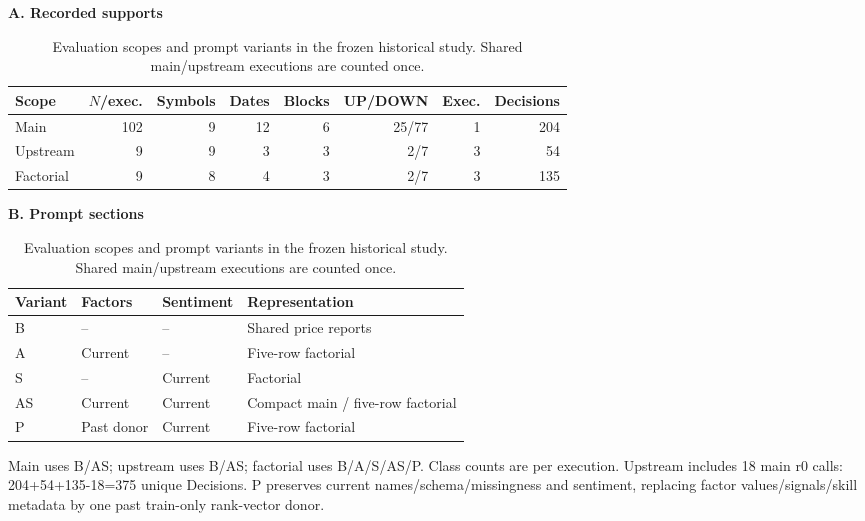 \begin{table}[!htbp]
\centering\small
\setlength{\tabcolsep}{3pt}
\renewcommand{\arraystretch}{1.15}
\caption{Evaluation scopes and prompt variants in the frozen historical study. Shared main/upstream executions are counted once.}
\label{tab:scope}
\textbf{A. Recorded supports}\par\smallskip
\begin{tabular}{lrrrrrrr}
\hline
Scope & $N$/exec. & Symbols & Dates & Blocks & UP/DOWN & Exec. & Decisions \\
\hline
Main & 102 & 9 & 12 & 6 & 25/77 & 1 & 204 \\
Upstream & 9 & 9 & 3 & 3 & 2/7 & 3 & 54 \\
Factorial & 9 & 8 & 4 & 3 & 2/7 & 3 & 135 \\
\hline
\end{tabular}\par\medskip
\textbf{B. Prompt sections}\par\smallskip
\begin{tabular}{llll}
\hline
Variant & Factors & Sentiment & Representation \\
\hline
B & -- & -- & Shared price reports \\
A & Current & -- & Five-row factorial \\
S & -- & Current & Factorial \\
AS & Current & Current & Compact main / five-row factorial \\
P & Past donor & Current & Five-row factorial \\
\hline
\end{tabular}\par\medskip
\begin{minipage}{\textwidth}\footnotesize Main uses B/AS; upstream uses B/AS; factorial uses B/A/S/AS/P. Class counts are per execution. Upstream includes 18 main r0 calls: 204+54+135-18=375 unique Decisions. P preserves current names/schema/missingness and sentiment, replacing factor values/signals/skill metadata by one past train-only rank-vector donor.\end{minipage}
\end{table}
